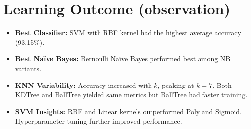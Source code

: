 \documentclass[12pt]{article}
\begin{document}
\section*{Learning Outcome (observation)}
\begin{itemize}
  \item \textbf{Best Classifier:} SVM with RBF kernel had the highest average accuracy (93.15\%).
  \item \textbf{Best Naïve Bayes:} Bernoulli Naïve Bayes performed best among NB variants.
  \item \textbf{KNN Variability:} Accuracy increased with $k$, peaking at $k=7$. Both KDTree and BallTree yielded same metrics but BallTree had faster training.
  \item \textbf{SVM Insights:} RBF and Linear kernels outperformed Poly and Sigmoid. Hyperparameter tuning further improved performance.
\end{itemize}
\end{document}
